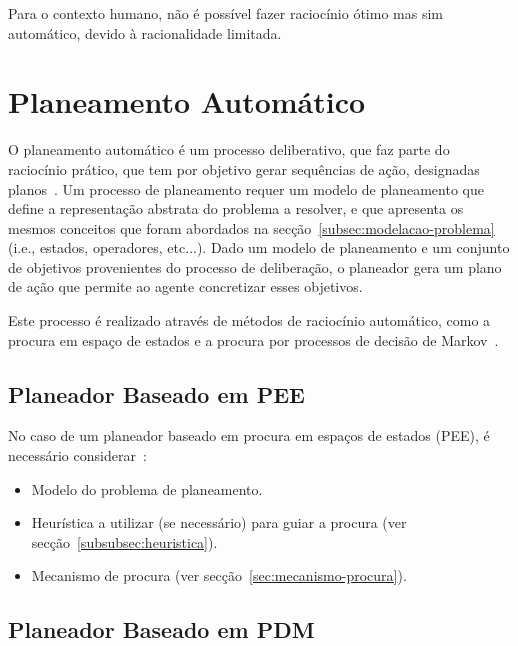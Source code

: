Para o contexto humano, não é possível fazer raciocínio ótimo mas sim automático, devido à racionalidade limitada.


\section{Planeamento Automático}\label{sec:planeamento-automatico}

O planeamento automático é um processo deliberativo, que faz parte do raciocínio prático,
que tem por objetivo
gerar sequências de ação, designadas planos~\cite{isel:iasa:slides:plan-autom-pee}.
Um processo de planeamento requer um modelo de planeamento que define a representação abstrata do problema a resolver, e que apresenta os mesmos conceitos que foram abordados na secção~\ref{subsec:modelacao-problema} (i.e., estados, operadores, etc...).
Dado um modelo de planeamento e um conjunto de objetivos provenientes do processo de deliberação, o planeador gera um plano de ação que permite ao agente concretizar esses objetivos.

Este processo é realizado através de métodos de raciocínio automático, como a procura em
espaço de estados e a procura por processos de decisão de Markov~\cite{isel:iasa:slides:plan-autom-pee}.

\subsection{Planeador Baseado em PEE}\label{subsec:planeador-baseado-em-pee}

No caso de um planeador baseado em procura em espaços de estados (PEE), é necessário considerar~\cite{isel:iasa:slides:plan-autom-pee}:

\begin{itemize}\label{itemize:planeador-baseado-em-pee}
    \item Modelo do problema de planeamento.
    \item Heurística a utilizar (se necessário) para guiar a procura (ver secção~\ref{subsubsec:heuristica}).
    \item Mecanismo de procura (ver secção~\ref{sec:mecanismo-procura}).
\end{itemize}

\subsection{Planeador Baseado em PDM}\label{subsec:planeador-baseado-em-pdm}

